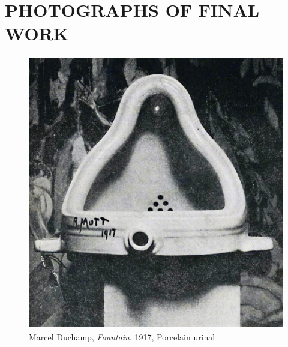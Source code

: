 \chapter{PHOTOGRAPHS OF FINAL WORK}

\begin{figure}[h!]
  \centering
  \includegraphics[height=12cm]{graphics/Duchamp_Fountaine.jpg}
  \caption{Marcel Duchamp, \textit{Fountain}, 1917, Porcelain urinal}
  \label{fig:Duchamp_Fountaine01}
\end{figure}


